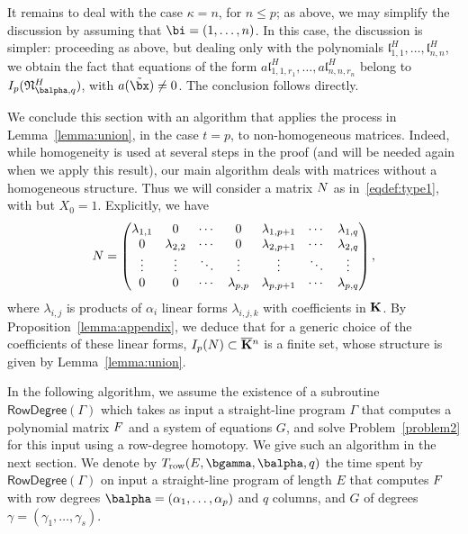 \documentclass[12pt]{article}
\begin{document}
It remains to deal with the case $\kappa=n$, for $n \le p$; as above,
we may simplify the discussion by assuming that $\bi=(1,\dots,n)$. In
this case, the discussion is simpler: proceeding as above, but dealing
only with the polynomials
$\mathfrak{l}^H_{1,1},\dots,\mathfrak{l}^H_{n,n}$, we obtain the fact
that equations of the form $a \mathfrak{l}^H_{1,1,r_1},\dots,a
\mathfrak{l}^H_{n,n,r_n}$ belong to $I_p(\mathfrak{N}^H_{\balpha,q})$,
with $a(\tilde\bx) \ne 0$. The conclusion follows directly.


\medskip

We conclude this section with an algorithm that applies the process
in Lemma~\ref{lemma:union}, in the case $t=p$, to non-homogeneous 
matrices. Indeed, while homogeneity is used at several steps in 
the proof (and will be needed again when we apply this result), our 
main algorithm deals with matrices without a homogeneous structure.
Thus we will consider a matrix ${N}$ as in~\eqref{eqdef:type1},
with but $X_0=1$. Explicitly, we have
\begin{align}\label{eqdef:type1aff}
{N}= \left( \begin{matrix}
\lambda_{1,1} & 0 & \cdots & 0 & \lambda_{1,p+1} & \cdots & \lambda_{1, q}\\
0 & \lambda_{2,2} & \cdots & 0 & \lambda_{2,p+1} & \cdots & \lambda_{2, q}\\
\vdots & \vdots & \ddots & \vdots & \vdots & \ddots & \vdots\\
0 & 0 & \cdots & \lambda_{p,p} & \lambda_{p,p+1} & \cdots & \lambda_{p, q}
\end{matrix} \right),
\end{align}
where $\lambda_{i,j}$ is products of $\alpha_i$ linear forms $\lambda_{i,j,k}$ with coefficients in $\mathbf{K}$.
By Proposition~\ref{lemma:appendix}, we deduce that for a generic
choice of the coefficients of these linear forms,
$I_p({N}) \subset \overline{\mathbf{K}}{}^n$ is a finite set, whose structure is 
given by Lemma~\ref{lemma:union}.

In the following algorithm, we assume the existence of a subroutine
$\mathsf{RowDegree}(\Gamma)$ which takes as input a straight-line
program $\Gamma$ that computes a polynomial matrix ${F}$ and a system
of equations $G$, and solve Problem~\ref{problem2} for this input
using a row-degree homotopy. We give such an algorithm in the next
section. We denote by $T_{\rm row}(E,\bgamma,\balpha,q)$ the time spent by
$\mathsf{RowDegree}(\Gamma)$ on input a straight-line program of
length $E$ that computes ${F}$ with row degrees
$\balpha=(\alpha_1,\dots,\alpha_p)$ and $q$ columns, and $G$ of
degrees $\gamma=(\gamma_1,\dots,\gamma_s)$. 
\end{document}
